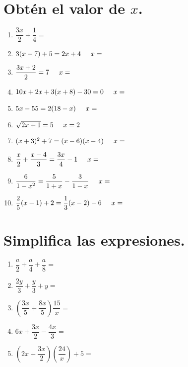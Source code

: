 \documentclass[14pt]{extarticle}
\begin{document}
\section{Obtén el valor de $x$.}

\begin{enumerate}
\item $\dfrac{3 x}{2} + \dfrac{1}{4} =$
\item $3 (x - 7) + 5 = 2 x + 4 \hspace{0.5cm} x =$
\item $\dfrac{3 x + 2}{2} = 7 \hspace{0.5cm} x =$
\item $10 x + 2 x + 3 (x + 8) - 30 = 0 \hspace{0.5cm} x =$
\item $5 x - 55 = 2 (18 - x) \hspace{0.5cm} x =$
\item $\sqrt{2 x + 1} = 5 \hspace{0.5cm} x =2$
\item $(x + 3)^{2} + 7 = (x - 6)(x - 4) \hspace{0.5cm} x =$
\item $\dfrac{x}{2} + \dfrac{x - 4}{3} = \dfrac{3 x}{4} - 1 \hspace{0.5cm} x =$
\item $\dfrac{6}{1 -x^{2}} = \dfrac{5}{1 + x} - \dfrac{3}{1 - x} \hspace{0.5cm} x =$
\item $\dfrac{2}{5} (x - 1) + 2 = \dfrac{1}{3} (x - 2) - 6 \hspace{0.5cm} x =$
\end{enumerate}

\section{Simplifica las expresiones.}

\begin{enumerate}
\item $\dfrac{a}{2} + \dfrac{a}{4} + \dfrac{a}{8} =$
\item $\dfrac{2 y}{3} + \dfrac{y}{3} + y =$
\item $\left( \dfrac{3 x}{5} + \dfrac{8 x}{5} \right) \dfrac{15}{x} =$
\item $6 x + \dfrac{3 x}{2} - \dfrac{4 x}{3} =$
\item $\left( 2 x + \dfrac{3 x}{2} \right) \left( \dfrac{24}{x} \right) + 5 =$
\end{enumerate}
\end{document}
